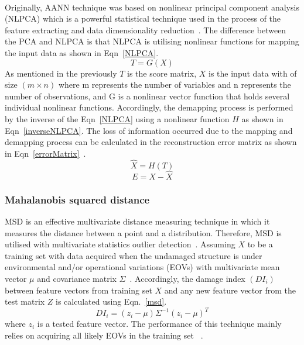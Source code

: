 \paragraph{}
Originally, AANN technique was based on nonlinear principal component analysis (NLPCA) which is a powerful statistical technique used in the process of the feature extracting and data dimensionality reduction~\cite{Dervilis2014}. 
The difference between the PCA and NLPCA is that NLPCA is utilising nonlinear functions for mapping the input data as shown in Eqn~\ref{NLPCA}.
\begin{equation}
	T= G(X)
	\label{NLPCA}
\end{equation} 
As mentioned in the previously $T$ is the score matrix, $X$ is the input data with of size $(m \times n)$ where m represents the number of variables and n represents the number of observations, and G is a nonlinear vector function that holds several individual nonlinear functions. 
Accordingly, the demapping process is performed by the inverse of the Eqn~\ref{NLPCA} using a nonlinear function $H$ as shown in Eqn~\ref{inverseNLPCA}.
The loss of information occurred due to the mapping and demapping process can be calculated in the reconstruction error matrix as shown in Eqn~\ref{errorMatrix}~\cite{Dervilis2014}.
\begin{equation}
	\hat{X} = H(T)
	\label{inverseNLPCA}
\end{equation}
\begin{equation}
	E= X-\hat{X}
	\label{errorMatrix}
\end{equation}
\subsubsection{Mahalanobis squared distance}
MSD is an effective multivariate distance measuring technique in which it measures the distance between a point and a distribution.
Therefore, MSD is utilised with multivariate statistics outlier detection~\cite{Worden2000}.
Assuming \(X\) to be a training set with data acquired when the undamaged structure is under environmental and/or operational variations (EOVs) with multivariate mean vector \(\mu\) and covariance matrix \(\Sigma\)~\cite{Farrar2013}.
Accordingly, the damage index \((DI_i)\) between feature vectors from training set \(X\) and any new feature vector from the test matrix \(Z\) is calculated using Eqn.~\ref{msd}.
\begin{equation}
	DI_i = (z_i-\mu)\Sigma^{-1}(z_i-\mu)^T
	\label{msd}
\end{equation}
where \(z_i\) is a tested feature vector.
The performance of this technique mainly relies on acquiring all likely EOVs in the training set~
\cite{Farrar2013}.
